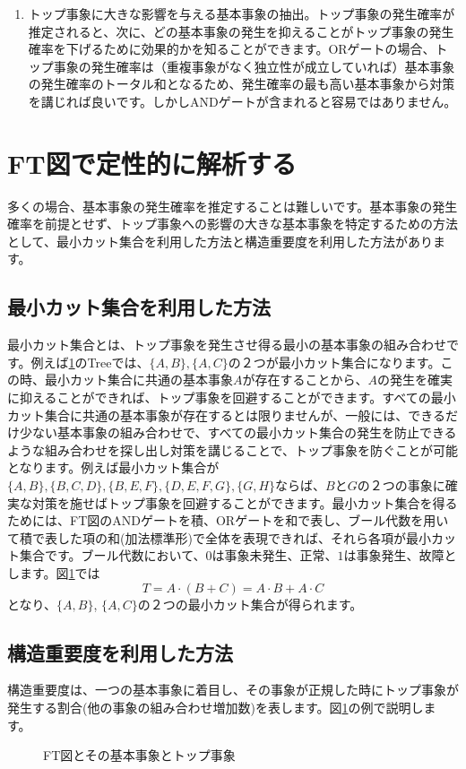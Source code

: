 \begin{enumerate}
\item トップ事象に大きな影響を与える基本事象の抽出。トップ事象の発生確率が推定されると、次に、どの基本事象の発生を抑えることがトップ事象の発生確率を下げるために効果的かを知ることができます。ORゲートの場合、トップ事象の発生確率は（重複事象がなく独立性が成立していれば）基本事象の発生確率のトータル和となるため、発生確率の最も高い基本事象から対策を講じれば良いです。しかしANDゲートが含まれると容易ではありません。
\end{enumerate}
\section{FT図で定性的に解析する}
多くの場合、基本事象の発生確率を推定することは難しいです。基本事象の発生確率を前提とせず、トップ事象への影響の大きな基本事象を特定するための方法として、最小カット集合を利用した方法と構造重要度を利用した方法があります。
\subsection{最小カット集合を利用した方法}
最小カット集合とは、トップ事象を発生させ得る最小の基本事象の組み合わせです。例えば\ref{422}のTreeでは、$\{A,B\}, \{A,C\}$の２つが最小カット集合になります。この時、最小カット集合に共通の基本事象$A$が存在することから、$A$の発生を確実に抑えることができれば、トップ事象を回避することができます。すべての最小カット集合に共通の基本事象が存在するとは限りませんが、一般には、できるだけ少ない基本事象の組み合わせで、すべての最小カット集合の発生を防止できるような組み合わせを探し出し対策を講じることで、トップ事象を防ぐことが可能となります。例えば最小カット集合が$\{A,B\},\{B,C,D\},\{B,E,F\},\{D,E,F,G\},\{G,H\}$ならば、$B$と$G$の２つの事象に確実な対策を施せばトップ事象を回避することができます。最小カット集合を得るためには、FT図のANDゲートを積、ORゲートを和で表し、ブール代数を用いて積で表した項の和(加法標準形)で全体を表現できれば、それら各項が最小カット集合です。ブール代数において、$0$は事象未発生、正常、$1$は事象発生、故障とします。図\ref{422}では
\[T=A\cdot (B+C) = A\cdot B + A \cdot C\]
となり、$\{A,B\}$, $\{A,C\}$の２つの最小カット集合が得られます。
\subsection{構造重要度を利用した方法}
構造重要度は、一つの基本事象に着目し、その事象が正規した時にトップ事象が発生する割合(他の事象の組み合わせ増加数)を表します。図\ref{422}の例で説明します。
\begin{figure}[htbp]
\begin{center}
\end{center}
\caption{FT図とその基本事象とトップ事象}
\label{422}
\end{figure}
\renewcommand{\labelenumi}{(\roman{enumi})}


